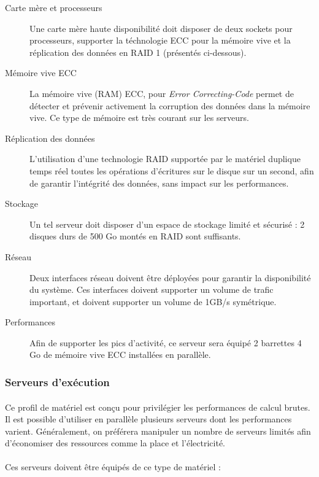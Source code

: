 \begin{description}
  \item[Carte mère et processeurs] Une carte mère haute disponibilité doit
  disposer de deux sockets pour processeurs, supporter la téchnologie ECC pour
  la mémoire vive et la réplication des données en RAID 1 (présentés
  ci-dessous).
  \item[Mémoire vive ECC] La mémoire vive (RAM) ECC, pour \emph{Error
  Correcting-Code} permet de détecter et prévenir activement la corruption des
  données dans la mémoire vive. Ce type de mémoire est très courant sur les
  serveurs.
  \item[Réplication des données] L'utilisation d'une technologie RAID supportée
  par le matériel duplique temps réel toutes les opérations d'écritures sur le
  disque sur un second, afin de garantir l'intégrité des données, sans impact
  sur les performances.
  \item[Stockage] Un tel serveur doit disposer d'un espace de stockage limité et
  sécurisé : 2 disques durs de 500 Go montés en RAID sont suffisants.
  \item[Réseau] Deux interfaces réseau doivent être déployées pour garantir la
  disponibilité du système. Ces interfaces doivent supporter un volume de
  trafic important, et doivent supporter un volume de 1GB/s symétrique.
  \item[Performances] Afin de supporter les pics d'activité, ce serveur sera
  équipé 2 barrettes 4 Go de mémoire vive ECC installées en parallèle.
\end{description}

\subsubsection{Serveurs d'exécution}

\paragraph{} Ce profil de matériel est conçu pour privilégier les performances
de calcul brutes. Il est possible d'utiliser en parallèle plusieurs serveurs
dont les performances varient. Généralement, on préférera manipuler un nombre de
serveurs limités afin d'économiser des ressources comme la place et
l'électricité.

\paragraph{} Ces serveurs doivent être équipés de ce type de matériel :


